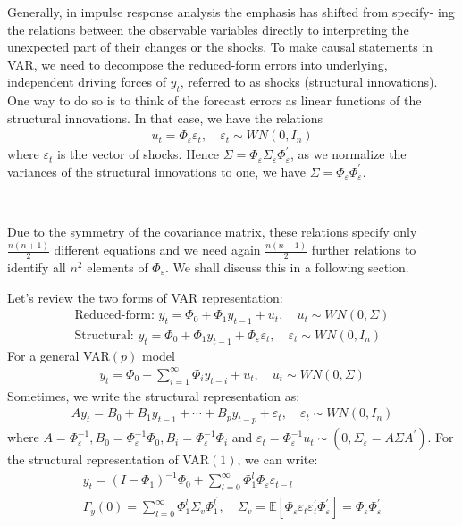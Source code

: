 Generally, in impulse response analysis the emphasis has shifted from specify-
ing the relations between the observable variables directly to interpreting the
unexpected part of their changes or the shocks. 
To make causal statements in VAR, we need to decompose the reduced-form errors into underlying, independent driving forces of $y_t$, referred to as shocks (structural innovations).
One way to do so is to think of the forecast errors as linear functions of the structural innovations.
In that case, we have the relations
\begin{gather*}
    u_t = \Phi_{\varepsilon} \varepsilon_t, \quad \varepsilon_t \sim WN(0, I_n)
\end{gather*}
where $\varepsilon_t$ is the vector of shocks. Hence $\Sigma = \Phi_{\varepsilon} \Sigma_{\varepsilon} \Phi_{\varepsilon}^{\prime}$,
as we normalize the variances of the structural innovations to one,
we have $\Sigma = \Phi_{\varepsilon} \Phi_{\varepsilon}^{\prime}$.

\begin{note}
    \

    Due to the symmetry of the covariance matrix, these relations specify only $\frac{n(n+1)}{2}$ different equations
and we need again $\frac{n(n-1)}{2}$ further relations to identify all $n^2$ elements of $\Phi_{\varepsilon}$.
We shall discuss this in a following section.
\end{note}

Let's review the two forms of VAR representation:
\begin{gather*}
    \text{Reduced-form: } y_t = \Phi_0 + \Phi_1 y_{t-1} + u_t, \quad u_t \sim WN(0, \Sigma) \\
    \text{Structural: } y_t = \Phi_0 + \Phi_1 y_{t-1} + \Phi_{\varepsilon} \varepsilon_t, \quad \varepsilon_t \sim WN(0, I_n)
\end{gather*}
For a general VAR$(p)$ model
\begin{gather*}
    y_t = \Phi_0 + \sum_{i=1}^{\infty} \Phi_i y_{t-i} + u_t, \quad u_t \sim WN(0, \Sigma)
\end{gather*}
Sometimes, we write the structural representation as:
\begin{gather*}
    A y_t = B_0 + B_1 y_{t-1} + \cdots + B_p y_{t-p} + \varepsilon_t, \quad \varepsilon_t \sim WN(0, I_n)
\end{gather*}
where $A = \Phi_{\varepsilon}^{-1} , B_0 = \Phi_{\varepsilon}^{-1} \Phi_0, B_i = \Phi_{\varepsilon}^{-1} \Phi_i$ and $\varepsilon_t = \Phi_{\varepsilon}^{-1} u_t \sim \left(0, \Sigma_{\varepsilon} = A \Sigma A^{\prime} \right).$
For the structural representation of VAR$(1)$, we can write:
\begin{gather*}
    y_t = \left(I - \Phi_1\right)^{-1} \Phi_0 + \sum_{l=0}^{\infty} \Phi_1^l \Phi_{\varepsilon} \varepsilon_{t-l}  \\
    \Gamma_y(0) = \sum_{l=0}^{\infty} \Phi_1^l \Sigma_v \Phi_1^{l^\prime}, \quad \Sigma_v = \mathbb{E}\left[\Phi_{\varepsilon}\varepsilon_t \varepsilon_t^{\prime} \Phi_{\varepsilon}^{\prime} \right] = \Phi_{\varepsilon} \Phi_{\varepsilon}^{\prime}
\end{gather*}

